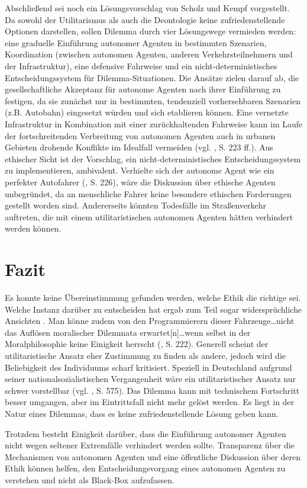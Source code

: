 \documentclass[a4paper, 12pt, titlepage]{scrartcl}
\begin{document}
	Abschlie\ss end sei noch ein L\"osungsvorschlag von Scholz und Kempf \autocite{Scholz2016} vorgestellt. Da sowohl der Utilitarismus als auch die Deontologie keine zufriedenstellende Optionen darstellen, sollen Dilemma durch vier L\"osungswege vermieden werden: eine graduelle Einf\"uhrung autonomer Agenten in bestimmten Szenarien, Koordination (zwischen autonomen Agenten, anderen Verkehrsteilnehmern und der Infrastruktur), eine defensive Fahrweise und ein nicht-deterministisches Entscheidungssystem f\"ur Dilemma-Situationen. Die Ans\"atze zielen darauf ab, die gesellschaftliche Akzeptanz f\"ur autonome Agenten nach ihrer Einf\"uhrung zu festigen, da sie zun\"achst nur in bestimmten, tendenziell vorhersehbaren Szenarien (z.B. Autobahn) eingesetzt w\"urden und sich etablieren k\"onnen. Eine vernetzte Infrastruktur in Kombination mit einer zur\"uckhaltenden Fahrweise kann im Laufe der fortschreitenden Verbreitung von autonomen Agenten auch in urbanen Gebieten drohende Konflikte im Idealfall vermeiden (vgl. \autocite{Scholz2016}, S. 223 ff.). Aus ethischer Sicht ist der Vorschlag, ein nicht-deterministisches Entscheidungssystem zu implementieren, ambivalent. Verhielte sich der autonome Agent \glqq wie ein perfekter Autofahrer\grqq{} (\autocite{Scholz2016}, S. 226), w\"are die Diskussion \"uber ethische Agenten unbegr\"undet, da an menschliche Fahrer keine besondere ethischen Forderungen gestellt worden sind. Andererseits k\"onnten Todesf\"alle im Stra\ss enverkehr auftreten, die mit einem utilitaristischen autonomen Agenten h\"atten verhindert werden k\"onnen. 
\section{Fazit}
	Es konnte keine \"Ubereinstimmung gefunden werden, welche Ethik die \glqq richtige\grqq{} sei. Welche Instanz dar\"uber zu entscheiden hat ergab zum Teil sogar widerspr\"uchliche Ansichten \autocite{Gogoll2016,Hevelke2015}. Man k\"onne zudem von \glqq den Programmierern dieser Fahrzeuge\dots nicht das Auflösen moralischer Dilemmata erwartet[n]\dots wenn selbst in der Moralphilosophie keine Einigkeit herrscht\grqq{} (\autocite{Scholz2016}, S. 222). Generell scheint der utilitaristische Ansatz eher Zustimmung zu finden als andere, jedoch wird die Beliebigkeit des Individuums scharf kritisiert. Speziell in Deutschland aufgrund seiner nationalsozialistischen Vergangenheit w\"are ein utilitaristischer Ansatz nur schwer vorstellbar (vgl. \autocite{Gless2016}, S. 575). Das Dilemma kann mit technischem Fortschritt besser umgangen, aber im Eintrittsfall nicht mehr gel\"ost werden. Es liegt in der Natur eines Dilemmas, dass es keine zufriedenstellende L\"osung geben kann. 
	
	Trotzdem besteht Einigkeit dar\"uber, dass die Einf\"uhrung autonomer Agenten nicht wegen seltener Extremf\"alle verhindert werden sollte. Transparenz \"uber die Mechanismen von autonomen Agenten und eine \"offentliche Diskussion \"uber deren Ethik k\"onnen helfen, den Entscheidungsvorgang eines autonomen Agenten zu verstehen und nicht als \glqq Black-Box\grqq{} aufzufassen. 
 

\newpage
\printbibliography
\end{document}
